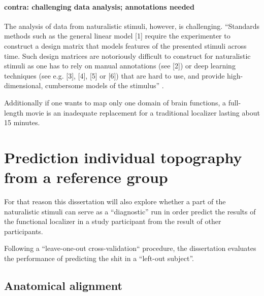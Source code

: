\paragraph{contra: challenging data analysis; annotations needed}


%
The analysis of data from naturalistic stimuli, however, is challenging.
%
``Standards methods such as the general linear model [1] require the
experimenter to construct a design matrix that models features of the presented
stimuli across time. Such design matrices are notoriously difficult to construct
for naturalistic stimuli as one has to rely on manual annotations (see [2]) or
deep learning techniques (see e.g. [3], [4], [5] or [6]) that are hard to use,
and provide high-dimensional, cumbersome models of the stimulus''
\citep{richard2019fast}.
%

Additionally if one wants to map only one domain of brain functions, a
full-length movie is an inadequate replacement for a traditional localizer
lasting about 15 minutes.


\section{Prediction individual topography from a reference group}






%
For that reason this dissertation will also explore whether a part of the
naturalistic stimuli can serve as a ``diagnostic'' run in order predict the
results of the functional localizer in a study participant from the result of
other participants.

%
Following a ``leave-one-out cross-validation`` procedure, the dissertation
evaluates the performance of predicting the shit in a ``left-out subject''.


\subsection{Anatomical alignment}


